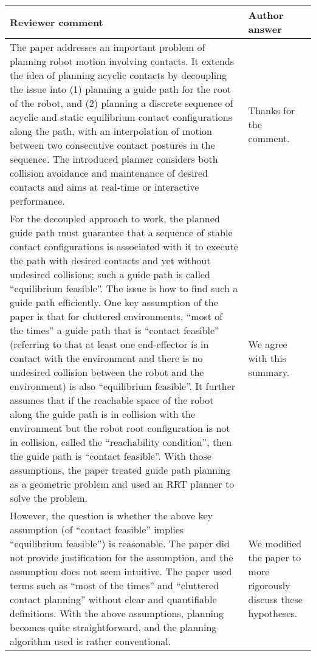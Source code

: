 \documentclass[a4paper]{article}
\begin{document}
\begin{longtable}{|p{21em}|p{21em}|}
\hline \bf Reviewer comment & \bf Author answer \\
\hline
The paper addresses an important problem of planning robot motion involving contacts. It extends the idea of planning acyclic contacts by decoupling the issue into (1) planning a guide path for the root of the robot, and (2) planning a discrete sequence of acyclic and static equilibrium contact configurations along the path, with an interpolation of motion between two consecutive contact postures in the sequence. The introduced planner considers both collision avoidance and maintenance of desired contacts and aims at real-time or interactive performance. 
&Thanks for the comment.
\\ \hline %
For the decoupled approach to work, the planned guide path must guarantee that a sequence of stable contact configurations is associated with it to execute the path with desired contacts and yet without undesired collisions; such a guide path is called “equilibrium feasible”. The issue is how to find such a guide path efficiently. One key assumption of the paper is that for cluttered environments, “most of the times” a guide path that is “contact feasible” (referring to that at least one end-effector is in contact with the environment and there is no undesired collision between the robot and the environment) is also “equilibrium feasible”. It further assumes that if the reachable space of the robot along the guide path is in collision with the environment but the robot root configuration is not in collision, called the “reachability condition”, then the guide path is “contact feasible”. With those assumptions, the paper treated guide path planning as a geometric problem and used an RRT planner to solve the problem. 
& We agree with this summary.
\\ \hline %
However, the question is whether the above key assumption (of 
“contact feasible” implies “equilibrium feasible”) is reasonable. The paper did not provide justification for the assumption, and the assumption does not seem intuitive. The paper used terms such as “most of the times” and “cluttered contact planning” without clear and quantifiable definitions. With the above assumptions, planning becomes quite straightforward, and the planning algorithm used is rather conventional. 
&
We modified the paper to more rigorously discuss these hypotheses. 

\end{longtable}
\end{document}
